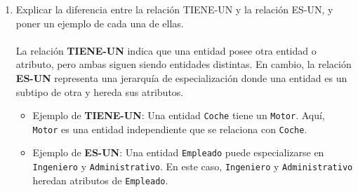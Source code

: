 \begin{enumerate}[label=\textbf{\arabic*.}, itemsep=0.5em]

    \item Explicar la diferencia entre la relación TIENE-UN y la relación ES-UN, y poner un ejemplo de cada una de ellas. \\\\ 
    La relación \textbf{TIENE-UN} indica que una entidad posee otra entidad o atributo, pero ambas siguen siendo entidades distintas. En cambio, la relación \textbf{ES-UN} representa una jerarquía de especialización donde una entidad es un subtipo de otra y hereda sus atributos.

    \begin{itemize}
        \item Ejemplo de \textbf{TIENE-UN}: Una entidad \texttt{Coche} tiene un \texttt{Motor}. Aquí, \texttt{Motor} es una entidad independiente que se relaciona con \texttt{Coche}.
        \item Ejemplo de \textbf{ES-UN}: Una entidad \texttt{Empleado} puede especializarse en \texttt{Ingeniero} y \texttt{Administrativo}. En este caso, \texttt{Ingeniero} y \texttt{Administrativo} heredan atributos de \texttt{Empleado}.
    \end{itemize}


\end{enumerate}
